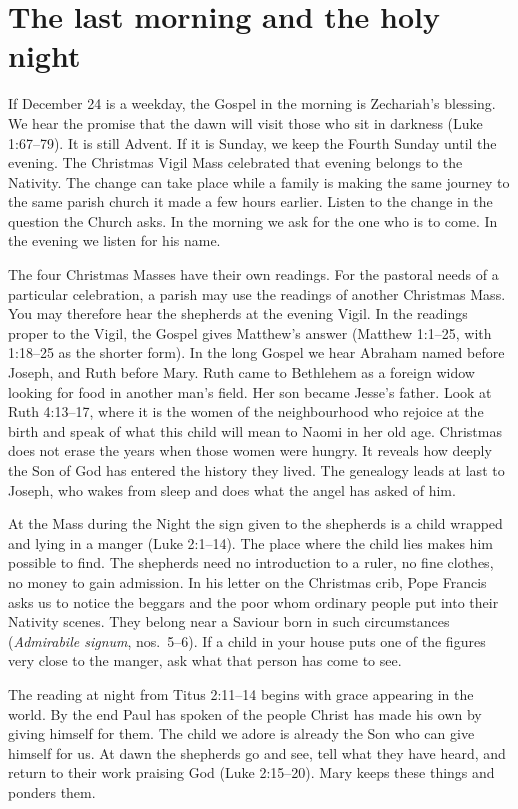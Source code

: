\section{The last morning and the holy night}
\label{sec:pc-christmas}

If December 24 is a weekday, the Gospel in the morning is Zechariah's blessing. We hear the promise that the dawn will visit those who sit in darkness (Luke 1:67--79). It is still Advent. If it is Sunday, we keep the Fourth Sunday until the evening. The Christmas Vigil Mass celebrated that evening belongs to the Nativity. The change can take place while a family is making the same journey to the same parish church it made a few hours earlier. Listen to the change in the question the Church asks. In the morning we ask for the one who is to come. In the evening we listen for his name.

The four Christmas Masses have their own readings. For the pastoral needs of a particular celebration, a parish may use the readings of another Christmas Mass. You may therefore hear the shepherds at the evening Vigil. In the readings proper to the Vigil, the Gospel gives Matthew's answer (Matthew 1:1--25, with 1:18--25 as the shorter form). In the long Gospel we hear Abraham named before Joseph, and Ruth before Mary. Ruth came to Bethlehem as a foreign widow looking for food in another man's field. Her son became Jesse's father. Look at Ruth 4:13--17, where it is the women of the neighbourhood who rejoice at the birth and speak of what this child will mean to Naomi in her old age. Christmas does not erase the years when those women were hungry. It reveals how deeply the Son of God has entered the history they lived. The genealogy leads at last to Joseph, who wakes from sleep and does what the angel has asked of him.

At the Mass during the Night the sign given to the shepherds is a child wrapped and lying in a manger (Luke 2:1--14). The place where the child lies makes him possible to find. The shepherds need no introduction to a ruler, no fine clothes, no money to gain admission. In his letter on the Christmas crib, Pope Francis asks us to notice the beggars and the poor whom ordinary people put into their Nativity scenes. They belong near a Saviour born in such circumstances (\emph{Admirabile signum}, nos.~5--6). If a child in your house puts one of the figures very close to the manger, ask what that person has come to see.

The reading at night from Titus 2:11--14 begins with grace appearing in the world. By the end Paul has spoken of the people Christ has made his own by giving himself for them. The child we adore is already the Son who can give himself for us. At dawn the shepherds go and see, tell what they have heard, and return to their work praising God (Luke 2:15--20). Mary keeps these things and ponders them.

